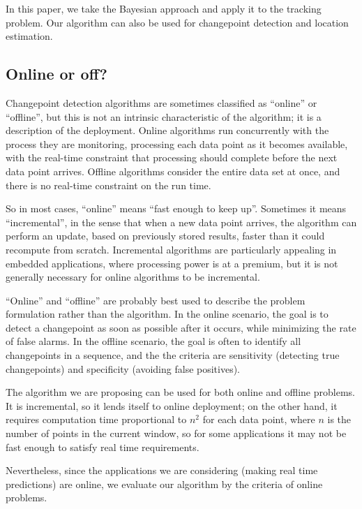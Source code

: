 \documentclass[twocolumn,11pt]{article}
\begin{document}
In this paper, we take the Bayesian approach and apply it to the
tracking problem.  Our algorithm can also be used for changepoint
detection and location estimation.

\subsection{Online or off?}

Changepoint detection algorithms are sometimes classified as
``online'' or ``offline'', but this is not an intrinsic characteristic
of the algorithm; it is a description of the deployment.  Online
algorithms run concurrently with the process they are monitoring,
processing each data point as it becomes available, with the real-time
constraint that processing should complete before the next data point
arrives.  Offline algorithms consider the entire data set at once, and
there is no real-time constraint on the run time.

So in most cases, ``online'' means ``fast enough to keep up''.
Sometimes it means ``incremental'', in the sense that when a new
data point arrives, the algorithm can perform an update, based on
previously stored results, faster than it could recompute from
scratch.  Incremental algorithms are particularly appealing in
embedded applications, where processing power is at a premium, but it
is not generally necessary for online algorithms to be incremental.

``Online'' and ``offline'' are probably best used to describe the
problem formulation rather than the algorithm.  In the online
scenario, the goal is to detect a changepoint as soon as possible
after it occurs, while minimizing the rate of false alarms.  In the
offline scenario, the goal is often to identify all changepoints
in a sequence, and the the criteria are sensitivity (detecting
true changepoints) and specificity (avoiding false positives).

The algorithm we are proposing can be used for both online and offline
problems.  It is incremental, so it lends itself to online deployment;
on the other hand, it requires computation time proportional to $n^2$
for each data point, where $n$ is the number of points in the
current window, so for some applications it may not be fast enough
to satisfy real time requirements.

Nevertheless, since the applications we are considering (making real
time predictions) are online, we evaluate our algorithm by the
criteria of online problems.
\end{document}
